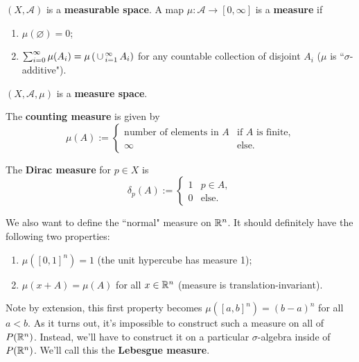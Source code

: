 \documentclass[twoside,10pt]{article}
\begin{document}
\begin{defn}[]
$(X,\mathcal{A})$ is a \textbf{measurable space}. A map $\mu: \mathcal{A} \to [0,\infty]$ is a \textbf{measure} if
\begin{enumerate}
	\item $\mu(\varnothing)=0$;
	\item $\sum_{i=0}^{\infty} \mu(A_{i}) = \mu\left( \operatorname{\,\cup\,}_{i=1}^{\infty}A_{i} \right)$ for any countable collection of disjoint $A_{i}$ ($\mu$ is ``$\sigma$-additive").
\end{enumerate}
$(X,\mathcal{A},\mu)$ is a \textbf{measure space}.
\end{defn}

\begin{ex}[]
The \textbf{counting measure} is given by
\[
\mu(A) :=
\begin{cases}
	\text{number of elements in $A$} & \text{if } A \text{ is finite,} \\
	\infty & \text{else}.
\end{cases}
\] 
\end{ex}

\newpage
\begin{ex}[]
The \textbf{Dirac measure} for $p \in X$ is
\[
\delta_{p}(A) :=
\begin{cases}
	1 & p \in A, \\
	0 & \text{else}.
\end{cases}
\] 
\end{ex}

We also want to define the ``normal" measure on $\mathbb{R}^{n}$. It should definitely have the following two properties:
\begin{enumerate}
	\item $\mu([0,1]^{n}) = 1$ (the unit hypercube has measure 1);
	\item $\mu(x+A) = \mu(A)$ for all $x \in \mathbb{R}^{n}$ (measure is translation-invariant).
\end{enumerate}
Note by extension, this first property becomes $\mu([a,b]^{n}) = (b-a)^{n}$ for all $a < b$. As it turns out, it's impossible to construct such a measure on all of $P(\mathbb{R}^{n})$. Instead, we'll have to construct it on a particular $\sigma$-algebra inside of $P( \mathbb{R}^{n})$. We'll call this the \textbf{Lebesgue measure}.
\end{document}
